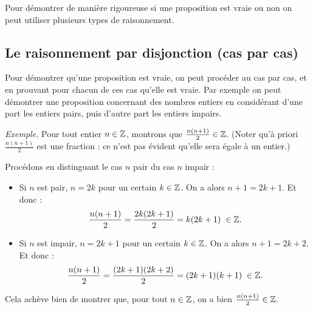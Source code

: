\documentclass[11pt,class=report,crop=false]{standalone}
\begin{document}





\bigskip

Pour démontrer de manière rigoureuse si une proposition est vraie ou non on peut utiliser plusieurs types de raisonnement.

\subsection*{Le raisonnement par disjonction (cas par cas)}

Pour démontrer qu'une proposition est vraie, on peut procéder au cas par cas, et en prouvant pour chacun de ces cas qu'elle est vraie. Par exemple on peut démontrer une proposition concernant des nombres entiers en considérant d'une part les entiers pairs, puis d'autre part les entiers impairs.

\bigskip

\emph{Exemple.}
Pour tout entier $n\in\mathbb{Z}$, montrons que $\frac{n(n+1)}{2} \in \mathbb{Z}$. (Noter qu'à priori $\frac{n(n+1)}{2}$ est une fraction : ce n'est pas évident qu'elle sera égale à un entier.)

Procédons en distinguant le cas $n$ pair du cas $n$ impair :
    \begin{itemize}
        \item Si $n$ est pair, $n=2k$ pour un certain $k \in \mathbb{Z}$. On a alors $n+1=2k+1$. Et donc :
        $$\frac{n(n+1)}{2}=\frac{2k(2k+1)}{2}=k(2k+1) \; \in \mathbb{Z}.$$
        \item Si $n$ est impair, $n=2k+1$ pour un certain $k \in \mathbb{Z}$. On a alors $n+1=2k+2$. Et donc :
        $$\frac{n(n+1)}{2}=\frac{(2k+1)(2k+2)}{2}=(2k+1)(k+1) \; \in \mathbb{Z}.$$
    \end{itemize}
Cela achève bien de montrer que, pour tout $n \in \mathbb{Z}$, on a bien $\frac{n(n+1)}{2} \in \mathbb{Z}$.
\end{document}
